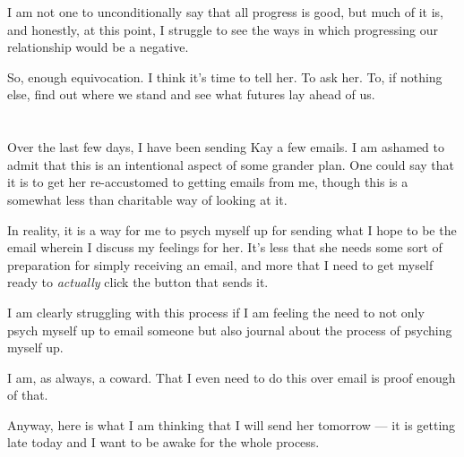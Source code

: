 I am not one to unconditionally say that all progress is good, but much of it is, and honestly, at this point, I struggle to see the ways in which progressing our relationship would be a negative.

So, enough equivocation. I think it's time to tell her. To ask her. To, if nothing else, find out where we stand and see what futures lay ahead of us.

\section{}

Over the last few days, I have been sending Kay a few emails. I am ashamed to admit that this is an intentional aspect of some grander plan. One could say that it is to get her re-accustomed to getting emails from me, though this is a somewhat less than charitable way of looking at it.

In reality, it is a way for me to psych myself up for sending what I hope to be the email wherein I discuss my feelings for her. It's less that she needs some sort of preparation for simply receiving an email, and more that I need to get myself ready to \emph{actually} click the button that sends it.

I am clearly struggling with this process if I am feeling the need to not only psych myself up to email someone but also journal about the process of psyching myself up.

I am, as always, a coward. That I even need to do this over email is proof enough of that.

Anyway, here is what I am thinking that I will send her tomorrow --- it is getting late today and I want to be awake for the whole process.

